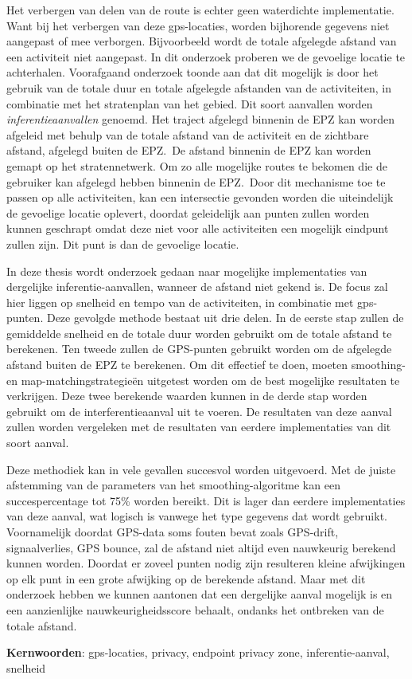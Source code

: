 Het verbergen van delen van de route is echter geen waterdichte implementatie.
Want bij het verbergen van deze gps-locaties, worden bijhorende gegevens niet
aangepast of mee verborgen. Bijvoorbeeld wordt de totale afgelegde afstand van
een activiteit niet aangepast. In dit onderzoek proberen we de gevoelige
locatie te achterhalen. Voorafgaand onderzoek toonde aan dat dit mogelijk is
door het gebruik van de totale duur en totale afgelegde afstanden van de
activiteiten, in combinatie met het stratenplan van het gebied. Dit soort
aanvallen worden \textit{inferentieaanvallen} genoemd. Het traject afgelegd
binnenin de EPZ kan worden afgeleid met behulp van de totale afstand van de
activiteit en de zichtbare afstand, afgelegd buiten de EPZ.\ De afstand
binnenin de EPZ kan worden gemapt op het stratennetwerk. Om zo alle mogelijke
routes te bekomen die de gebruiker kan afgelegd hebben binnenin de EPZ.\ Door
dit mechanisme toe te passen op alle activiteiten, kan een intersectie gevonden
worden die uiteindelijk de gevoelige locatie oplevert, doordat geleidelijk aan
punten zullen worden kunnen geschrapt omdat deze niet voor alle activiteiten
een mogelijk eindpunt zullen zijn. Dit punt is dan de gevoelige locatie.

In deze thesis wordt onderzoek gedaan naar mogelijke implementaties van
dergelijke inferentie-aanvallen, wanneer de afstand niet gekend is. De focus
zal hier liggen op snelheid en tempo van de activiteiten, in combinatie met
gps-punten. Deze gevolgde methode bestaat uit drie delen. In de eerste stap
zullen de gemiddelde snelheid en de totale duur worden gebruikt om de totale
afstand te berekenen. Ten tweede zullen de GPS-punten gebruikt worden om de
afgelegde afstand buiten de EPZ te berekenen. Om dit effectief te doen, moeten
smoothing- en map-matchingstrategieën uitgetest worden om de best mogelijke
resultaten te verkrijgen. Deze twee berekende waarden kunnen in de derde stap
worden gebruikt om de interferentieaanval uit te voeren. De resultaten van deze
aanval zullen worden vergeleken met de resultaten van eerdere implementaties
van dit soort aanval.

Deze methodiek kan in vele gevallen succesvol worden uitgevoerd. Met de juiste
afstemming van de parameters van het smoothing-algoritme kan een
succespercentage tot 75\% worden bereikt. Dit is lager dan eerdere
implementaties van deze aanval, wat logisch is vanwege het type gegevens dat
wordt gebruikt. Voornamelijk doordat GPS-data soms fouten bevat zoals
GPS-drift, signaalverlies, GPS bounce, zal de afstand niet altijd even
nauwkeurig berekend kunnen worden\cite{BadGPSDa19:online}. Doordat er zoveel
punten nodig zijn resulteren kleine afwijkingen op elk punt in een grote
afwijking op de berekende afstand. Maar met dit onderzoek hebben we kunnen
aantonen dat een dergelijke aanval mogelijk is en een aanzienlijke
nauwkeurigheidsscore behaalt, ondanks het ontbreken van de totale afstand.

\textbf{Kernwoorden}: gps-locaties, privacy, endpoint privacy zone,
inferentie-aanval, snelheid